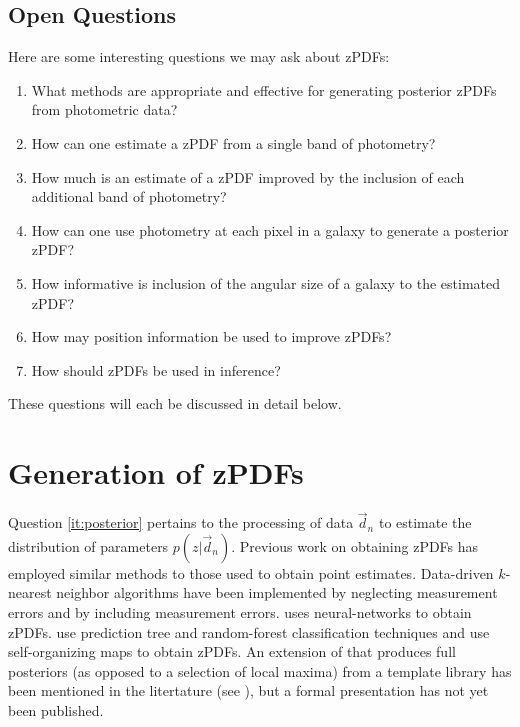 \documentclass[12pt, onecolumn]{emulateapj}
\begin{document}
\subsection{Open Questions}

Here are some interesting questions we may ask about zPDFs:

\begin{enumerate}
\item \label{it:posterior} What methods are appropriate and effective for generating posterior zPDFs from photometric data?
\item \label{it:single} How can one estimate a zPDF from a single band of photometry?
\item \label{it:plus} How much is an estimate of a zPDF improved by the inclusion of each additional band of photometry? 
\item \label{it:pixel} How can one use photometry at each pixel in a galaxy to generate a posterior zPDF?
\item \label{it:spatial} How informative is inclusion of the angular size of a galaxy to the estimated zPDF?
\item \label{it:croscor} How may position information be used to improve zPDFs?
\item \label{it:inference} How should zPDFs be used in inference?
\end{enumerate}

These questions will each be discussed in detail below.

\section{Generation of zPDFs}

Question \ref{it:posterior} pertains to the processing of data $\vec{d}_{n}$ to estimate the distribution of parameters $p(z|\vec{d}_{n})$.  Previous work on obtaining zPDFs has employed similar methods to those used to obtain point estimates. Data-driven $k$-nearest neighbor algorithms have been implemented by \citet{she11} neglecting measurement errors and by \citet{bal08} including measurement errors.  \citet{bon13} uses neural-networks to obtain zPDFs.  \citet{car13} use prediction tree and random-forest classification techniques and \citet{car14} use self-organizing maps  to obtain zPDFs.  An extension of \citet{ben00} that produces full posteriors (as opposed to a selection of local maxima) from a template library has been mentioned in the litertature (see \citet{lop14}), but a formal presentation has not yet been published.
\end{document}
